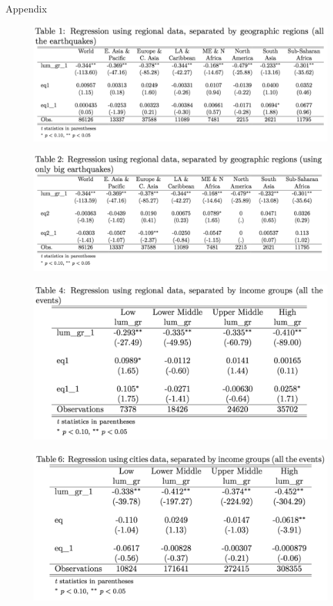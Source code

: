 \documentclass{beamer}
\begin{document}
\begin{section}{Appendix}
    \begin{figure}
      \centering
      \includegraphics[width=\linewidth]{table1}\label{fig:table1}
    \end{figure}
    \begin{figure}
      \centering
      \includegraphics[width=\linewidth]{table2}\label{fig:table2}
    \end{figure}
    \begin{figure}
      \centering
      \includegraphics[width=\linewidth]{table4}\label{fig:table4}
    \end{figure}
    \begin{figure}
      \centering
      \includegraphics[width=\linewidth]{table5}\label{fig:table5}

\end{figure}
\end{section}
\end{document}
